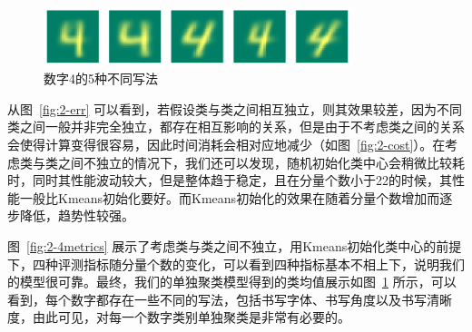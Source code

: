 \documentclass[UTF8]{ctexart}
\begin{document}
\begin{figure}[!h]
  \centering
  \includegraphics[width=0.8\textwidth]{./figures/diff4.pdf}
  \vspace{-.3cm}\caption{数字4的5种不同写法}\label{fig:diff4}
\end{figure}

从图~\ref{fig:2-err} 可以看到，若假设类与类之间相互独立，则其效果较差，因为不同类之间一般并非完全独立，都存在相互影响的关系，但是由于不考虑类之间的关系会使得计算变得很容易，因此时间消耗会相对应地减少（如图~\ref{fig:2-cost}）。在考虑类与类之间不独立的情况下，我们还可以发现，随机初始化类中心会稍微比较耗时，同时其性能波动较大，但是整体趋于稳定，且在分量个数小于22的时候，其性能一般比Kmeans初始化要好。而Kmeans初始化的效果在随着分量个数增加而逐步降低，趋势性较强。

图~\ref{fig:2-4metrics} 展示了考虑类与类之间不独立，用Kmeans初始化类中心的前提下，四种评测指标随分量个数的变化，可以看到四种指标基本不相上下，说明我们的模型很可靠。最终，我们的单独聚类模型得到的类均值展示如图~\ref{fig:diff4} 所示，可以看到，每个数字都存在一些不同的写法，包括书写字体、书写角度以及书写清晰度，由此可见，对每一个数字类别单独聚类是非常有必要的。

\end{document}
